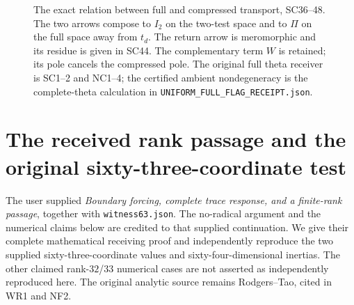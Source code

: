 \begin{figure}[p]
\centering
{}
\caption{The exact relation between full and compressed transport,
SC36--48. The two arrows compose to \(I_2\) on the two-test
space and to \(\Pi\) on the full space away from \(t_d\).
The return arrow is meromorphic and its residue is given in
SC44. The complementary term \(W\) is retained; its pole
cancels the compressed pole. The original full theta receiver
is SC1--2 and NC1--4; the certified ambient nondegeneracy is
the complete-theta calculation in
\texttt{UNIFORM\_FULL\_FLAG\_RECEIPT.json}.}
\label{fig:ambient-compressed-cancellation}
\end{figure}

\section{The received rank passage and the original sixty-three-coordinate test}

The user supplied \emph{Boundary forcing, complete trace response,
and a finite-rank passage}, together with \texttt{witness63.json}.
The no-radical argument and the numerical claims below are credited
to that supplied continuation. We give their complete mathematical
receiving proof and independently reproduce the two supplied
sixty-three-coordinate values and sixty-four-dimensional inertias.
The other claimed rank-$32$/$33$ numerical cases are not asserted
as independently reproduced here. The original analytic source
remains Rodgers--Tao, cited in WR1 and NF2.

